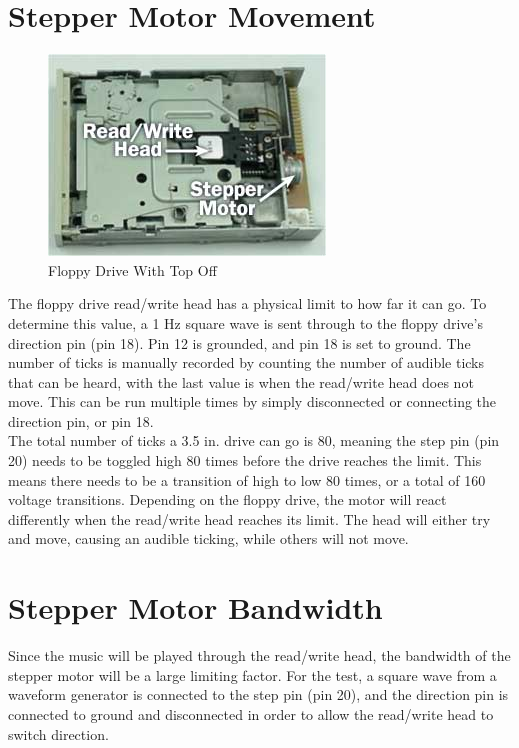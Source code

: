 \documentclass[11pt, a4paper]{report}
\begin{document}
\section{Stepper Motor Movement}

\begin{figure}[H]
\hspace*{-2cm}    
    \centering
    \includegraphics[width=.3\textwidth]{floppydrive_coveroff.jpg}
    \caption{Floppy Drive With Top Off}
    \label{fig:coveroff}
\end{figure}

The floppy drive read/write head has a physical limit to how far it can go. To determine this value, a 1 Hz square wave is sent through to the floppy drive's direction pin (pin 18). Pin 12 is grounded, and pin 18 is set to ground. The number of ticks is manually recorded by counting the number of audible ticks that can be heard, with the last value is when the read/write head does not move. This can be run multiple times by simply disconnected or connecting the direction pin, or pin 18. \\

The total number of ticks a 3.5 in. drive can go is 80, meaning the step pin (pin 20) needs to be toggled high 80 times before the drive reaches the limit. This means there needs to be a transition of high to low 80 times, or a total of 160 voltage transitions. Depending on the floppy drive, the motor will react differently when the read/write head reaches its limit. The head will either try and move, causing an audible ticking, while others will not move. \\

\section{Stepper Motor Bandwidth}

Since the music will be played through the read/write head, the bandwidth of the stepper motor will be a large limiting factor. For the test, a square wave from a waveform generator is connected to the step pin (pin 20), and the direction pin is connected to ground and disconnected in order to allow the read/write head to switch direction. \\
\end{document}
